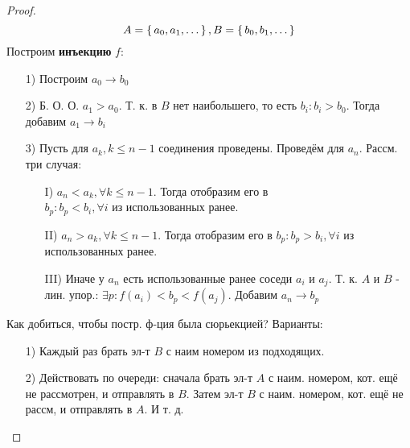 \begin{proof}
\[
A = \set{a_0, a_1, \ldots}, B = \set{b_0, b_1, \ldots}
\]
Построим \textbf{инъекцию} $f$:
\begin{itemize}
  \item [1) ] Построим $a_0 \rightarrow b_0$
  \item [2) ] Б. О. О. $a_1 > a_0$. Т. к. в $B$ нет наибольшего, то есть $b_i \colon b_i > b_0$. Тогда добавим $a_1 \rightarrow b_i$
  \item [3) ] Пусть для $a_k, k \leq n - 1$ соединения проведены. Проведём для $a_n$. Рассм. три случая:
    \begin{itemize}
      \item [I) ] $a_n < a_k, \forall k \leq n - 1$. Тогда отобразим его в $b_p \colon b_p < b_i, \forall i \text{ из использованных ранее}$.
      \item [II) ] $a_n > a_k, \forall k \leq n - 1$. Тогда отобразим его в $b_p \colon b_p > b_i, \forall i$ из использованных ранее.
      \item [III) ] Иначе у $a_n$ есть использованные ранее соседи $a_i$ и $a_j$. Т. к. $A$ и $B$ - лин. упор.: $\exists p \colon f(a_i) < b_p < f(a_j)$. Добавим $a_n \rightarrow b_p$
    \end{itemize}
\end{itemize}
Как добиться, чтобы постр. ф-ция была сюрьекцией? Варианты:
\begin{itemize}
  \item [1) ] Каждый раз брать эл-т $B$ с наим номером из подходящих.
  \item [2) ] Действовать по очереди: сначала брать эл-т $A$ с наим. номером, кот. ещё не рассмотрен, и отправлять в $B$. Затем эл-т $B$ с наим. номером, кот. ещё не рассм, и отправлять в $A$. И т. д.
\end{itemize}
\end{proof}

